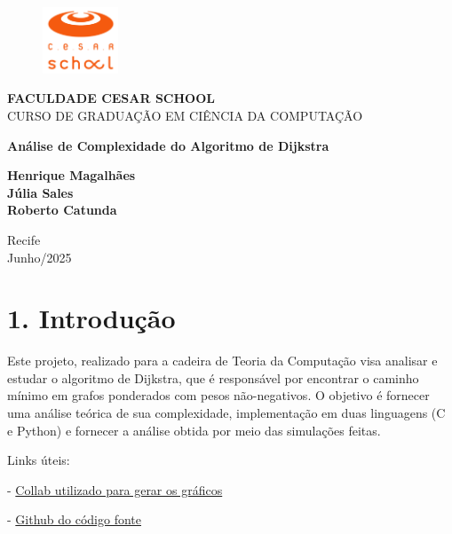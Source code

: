 \documentclass[12pt,a4paper]{report}
\begin{document}
\frenchspacing

\begin{titlepage}
\begin{figure}[h!] 
    \centering
    \includegraphics[width=0.2\textwidth]{logo.png}
    \label{fig:logo}
\end{figure}
\begin{center}
    \large
    \textbf{FACULDADE CESAR SCHOOL}\\
    CURSO DE GRADUAÇÃO EM CIÊNCIA DA COMPUTAÇÃO

    \vfill

    \Huge
    \textbf{Análise de Complexidade do Algoritmo de Dijkstra}

    \vfill

    \large
    \textbf{Henrique Magalhães\\
    Júlia Sales\\
    Roberto Catunda}

    \vfill

    \normalsize
    Recife \\
    Junho/2025
\end{center}
\end{titlepage}

\newpage
\tableofcontents
\newpage

\renewcommand{\chaptername}{}  
\renewcommand{\thechapter}{}   

\chapter{1. Introdução}

Este projeto, realizado para a cadeira de Teoria da Computação visa analisar e estudar o algoritmo de Dijkstra, que é responsável por encontrar o caminho mínimo em grafos ponderados com pesos não-negativos. O objetivo é fornecer uma análise teórica de sua complexidade, implementação em duas linguagens (C e Python) e fornecer a análise obtida por meio das simulações feitas.

Links úteis:

- \href{https://colab.research.google.com/drive/12GPpVhj-tCwuHSAhOKFfujmenyjhA5-J?usp=sharing}{Collab utilizado para gerar os gráficos}

- \href{https://github.com/julsales/DijkstraTC}{Github do código fonte}
\end{document}
